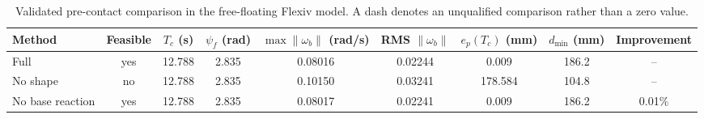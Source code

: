 \begin{table}[t]
\centering
\caption{Validated pre-contact comparison in the free-floating Flexiv model. A dash denotes an unqualified comparison rather than a zero value.}
\label{tab:precontact_comparison}
\begin{tabular}{lcccccccc}
\toprule
Method & Feasible & $T_c$ (s) & $\psi_f$ (rad) & $\max\|\omega_b\|$ (rad/s) & RMS $\|\omega_b\|$ & $e_p(T_c)$ (mm) & $d_{\min}$ (mm) & Improvement \\
\midrule
Full & yes & 12.788 & 2.835 & 0.08016 & 0.02244 & 0.009 & 186.2 & -- \\
No shape & no & 12.788 & 2.835 & 0.10150 & 0.03241 & 178.584 & 104.8 & -- \\
No base reaction & yes & 12.788 & 2.835 & 0.08017 & 0.02241 & 0.009 & 186.2 & 0.01\% \\
\bottomrule
\end{tabular}
\end{table}
